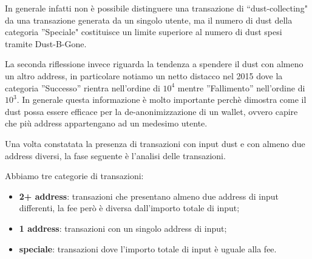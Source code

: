 In generale infatti non è possibile distinguere una transazione di ``dust-collecting" da una transazione generata da un singolo utente, ma il numero di dust della categoria ''Speciale" costituisce un limite superiore al numero di dust spesi tramite Dust-B-Gone.

La seconda riflessione invece riguarda la tendenza a spendere il dust con almeno un altro address, in particolare notiamo un netto distacco nel 2015 dove la categoria ”Successo” rientra nell’ordine di $10^4$ mentre ”Fallimento” nell’ordine di $10^3$. In generale questa informazione è molto importante perchè dimostra come il dust possa essere efficace per la de-anonimizzazione di un wallet, ovvero capire che più address appartengano ad un medesimo utente.

Una volta constatata la presenza di transazioni con input dust e con almeno due address diversi, la fase seguente è l'analisi delle transazioni. 

Abbiamo tre categorie di transazioni: 
\begin{itemize}
    \item \textbf{2+ address}: transazioni che presentano almeno due address di input differenti, la fee però è diversa dall'importo totale di input;
    \item \textbf{1 address}: transazioni con un singolo address di input;
    \item \textbf{speciale}: transazioni dove l'importo totale di input è uguale alla fee.
\end{itemize}

